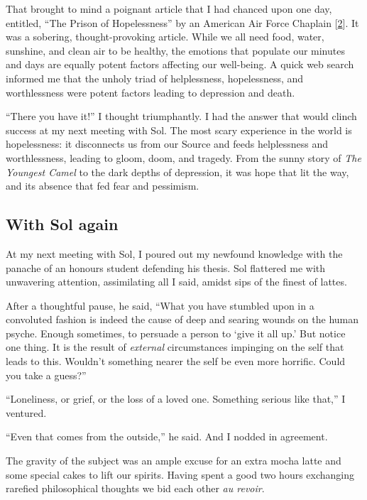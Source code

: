 \documentclass[
  a4paper,
]{article}
\begin{document}
That brought to mind a poignant article that I had chanced upon one day,
entitled, ``The Prison of Hopelessness'' by an American Air Force
Chaplain {[}\protect\hyperlink{ref-wilson2006}{2}{]}. It was a sobering,
thought-provoking article. While we all need food, water, sunshine, and
clean air to be healthy, the emotions that populate our minutes and days
are equally potent factors affecting our well-being. A quick web search
informed me that the unholy triad of helplessness, hopelessness, and
worthlessness were potent factors leading to depression and death.

``There you have it!'' I thought triumphantly. I had the answer that
would clinch success at my next meeting with Sol. The most scary
experience in the world is hopelessness: it disconnects us from our
Source and feeds helplessness and worthlessness, leading to gloom, doom,
and tragedy. From the sunny story of \emph{The Youngest Camel} to the
dark depths of depression, it was hope that lit the way, and its absence
that fed fear and pessimism.

\hypertarget{with-sol-again}{%
\subsection{With Sol again}\label{with-sol-again}}

At my next meeting with Sol, I poured out my newfound knowledge with the
panache of an honours student defending his thesis. Sol flattered me
with unwavering attention, assimilating all I said, amidst sips of the
finest of lattes.

After a thoughtful pause, he said, ``What you have stumbled upon in a
convoluted fashion is indeed the cause of deep and searing wounds on the
human psyche. Enough sometimes, to persuade a person to `give it all
up.' But notice one thing. It is the result of \emph{external}
circumstances impinging on the self that leads to this. Wouldn't
something nearer the self be even more horrific. Could you take a
guess?''

``Loneliness, or grief, or the loss of a loved one. Something serious
like that,'' I ventured.

``Even that comes from the outside,'' he said. And I nodded in
agreement.

The gravity of the subject was an ample excuse for an extra mocha latte
and some special cakes to lift our spirits. Having spent a good two
hours exchanging rarefied philosophical thoughts we bid each other
\emph{au revoir}.
\end{document}
